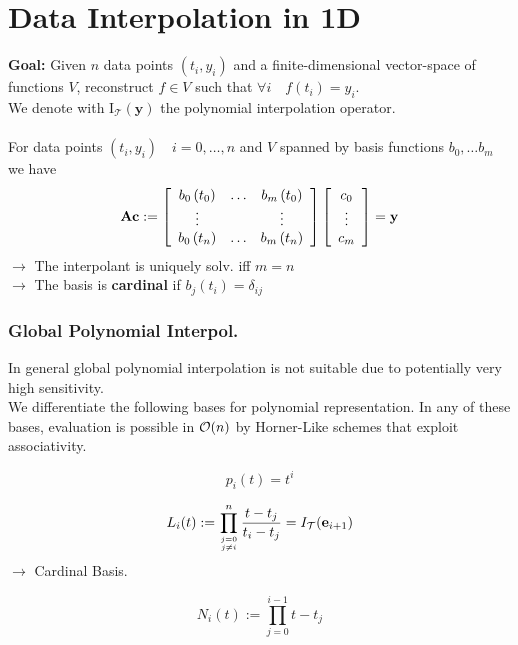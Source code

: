 \columnbreak
\part{Data Interpolation in 1D}
\setcounter{section}{0}

\textbf{Goal:} Given $n$ data points $(t_i, y_i)$ and a finite-dimensional vector-space of functions $V$, reconstruct $f\in V$ such that $\forall i \quad f(t_i)=y_i$. \\
We denote with $\mathrm{I}_{\mathcal{T}}(\mathbf{y})$ the polynomial interpolation operator. \\

 \\
For data points $(t_i, y_i) \quad i=0,\dots,n$
and $V$ spanned by basis functions $b_0,\dots b_m$ we have
$$
\mathbf{A} \mathbf{c}:=\left[\begin{array}{ccc}
b_{0}\left(t_{0}\right) & \ldots & b_{m}\left(t_{0}\right) \\
\vdots & & \vdots \\
b_{0}\left(t_{n}\right) & \ldots & b_{m}\left(t_{n}\right)
\end{array}\right]\left[\begin{array}{c}
c_{0} \\
\vdots \\
c_{m}
\end{array}\right]=\mathbf{y}
$$
$\rightarrow$ The interpolant is uniquely solv. iff $m=n$\\
$\rightarrow$ The basis is \textbf{cardinal} if $b_{j}\left(t_{i}\right)=\delta_{i j}$

\section{Global Polynomial Interpol.}
In general global polynomial interpolation is not suitable due to potentially very high sensitivity. \\
We differentiate the following bases for polynomial representation. In any of these bases, evaluation is possible in $\mathcal{O}(n)$ by Horner-Like schemes that exploit associativity.

$$ p_i(t) = t^i$$

$$L_{i}(t):=\prod_{j=0 \atop j \neq i}^{n} \frac{t-t_{j}}{t_{i}-t_{j}} = I_\mathcal{T}(\mathbf{e}_{i+1})$$
$\rightarrow$ Cardinal Basis.

$$N_{i}(t):=\prod_{j=0}^{i-1} t-t_{j}$$

